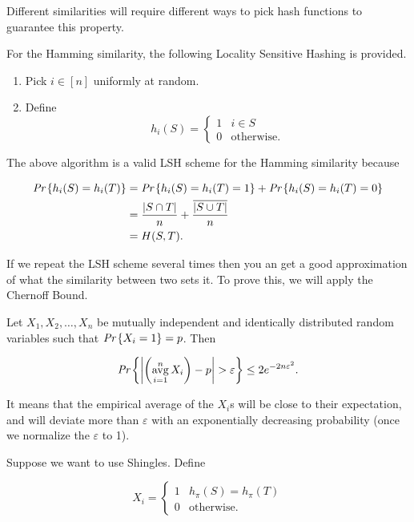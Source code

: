 Different similarities will require different ways to pick hash functions to guarantee this property.


For the Hamming similarity, the following Locality Sensitive Hashing is provided.

\begin{enumerate}
	\item Pick $i \in [n]$ uniformly at random.
	\item Define
	\begin{equation}
	h_i(S) = \begin{cases} 1 & i\in S\\ 0 & \text{otherwise.}
	\end{cases}
	\end{equation}
\end{enumerate}

The above algorithm is a valid LSH scheme for the Hamming similarity because

\begin{align}
	\emph{Pr}\left\{h_i(S) = h_i(T)\right\} & = \emph{Pr}\left\{h_i(S) = h_i(T) = 1\right\} + \emph{Pr}\left\{h_i(S) = h_i(T) = 0\right\}\\
	& = \frac{|S \cap T|}{n} + \frac{\overline{|S \cup T|}}{n}\\
	& = H(S, T). 
\end{align}

If we repeat the LSH scheme several times then you an get a good approximation of what the similarity between two sets it. To prove this, we will apply the Chernoff Bound.

\begin{defn}
Let $X_1, X_2, \ldots, X_n$ be mutually independent and identically distributed random variables such that $\emph{Pr}\left\{X_i = 1\right\} = p$. Then

\begin{equation}\label{eq:chernoff_additive}
	\emph{Pr}\left\{\left|\left(\operatorname*{avg}_{i = 1}^n X_i\right) - p\right| > \varepsilon\right\} \leq 2e^{-2n\varepsilon^2}.
\end{equation}
\end{defn}

It means that the empirical average of the $X_i$s will be close to their expectation, and will deviate more than $\varepsilon$ with an exponentially decreasing probability (once we normalize the $\varepsilon$ to 1).

Suppose we want to use Shingles. Define

\begin{equation}
X_i = \begin{cases} 1 & h_\pi(S) = h_\pi(T)\\ 0 & \text{otherwise.}\end{cases}
\end{equation}

